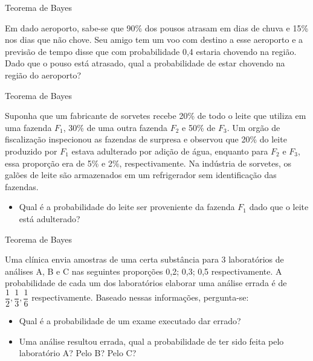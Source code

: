 \begin{frame}{Teorema de Bayes}
        \begin{exemplo}[3]
        Em dado aeroporto, sabe-se que 90\% dos pousos atrasam em dias de chuva e 15\% nos dias que não chove. Seu amigo tem um voo com destino a esse aeroporto e a previsão de tempo disse que com probabilidade 0,4 estaria chovendo na região. Dado que o pouso está atrasado, qual a probabilidade de estar chovendo na região do aeroporto?
    \end{exemplo}
\end{frame}
\begin{frame}{Teorema de Bayes}
    \begin{exemplo}[4]
        Suponha que um fabricante de sorvetes recebe 20\% de todo o leite que utiliza em uma fazenda $F_1$, 30\% de uma outra fazenda $F_2$ e 50\% de $F_3$. Um orgão de fiscalização inspecionou as fazendas de surpresa e observou que 20\% do leite produzido por $F_1$ estava adulterado por adição de água, enquanto para $F_2$ e $F_3$, essa proporção era de 5\% e 2\%, respectivamente. Na indústria de sorvetes, os galões de leite são armazenados em um refrigerador sem identificação das fazendas. 

        \begin{itemize}
            \item Qual é a probabilidade do leite ser proveniente da fazenda $F_1$ dado que o leite está adulterado?
        \end{itemize}
    \end{exemplo}

    
\end{frame}

\begin{frame}{Teorema de Bayes}
\begin{exemplo}[5]
        Uma clínica envia amostras de uma certa substância para 3 laboratórios de análises A, B e C nas seguintes proporções 0,2; 0,3; 0,5 respectivamente. A probabilidade de cada um dos laboratórios elaborar uma análise errada é de $\dfrac{1}{2}, \dfrac{1}{3}, \dfrac{1}{6}$ respectivamente. Baseado nessas informações, pergunta-se:

    \begin{itemize}
        \item Qual é a probabilidade de um exame executado dar errado?
        \item Uma análise resultou errada, qual a probabilidade de ter sido feita pelo laboratório A? Pelo B? Pelo C?
    \end{itemize}
\end{exemplo}

\end{frame}

